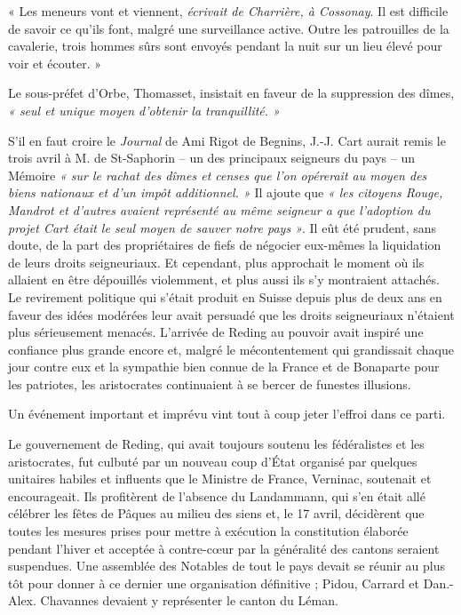 \documentclass[french,twoside]{book} %
\newenvironment{quoteblock}%
  {\begin{quoting}}
  {\end{quoting}}
\newenvironment{quotebar}{%
    \def\FrameCommand{{\color{rubric!10!}\vrule width 0.5em} \hspace{0.9em}}%
    \def\OuterFrameSep{\itemsep} %
    \MakeFramed {\advance\hsize-\width \FrameRestore}
  }%
  {%
    \endMakeFramed
  }
\renewenvironment{quoteblock}%
  {%
    \savenotes
    \setstretch{0.9}
    \begin{quotebar}
  }
  {%
    \end{quotebar}
    \spewnotes
  }
\begin{document}
\begin{quoteblock}
\noindent « Les meneurs vont et viennent, \emph{écrivait de Charrière, à Cossonay}. Il est difficile de savoir ce qu’ils font, malgré une surveillance active. Outre les patrouilles de la cavalerie, trois hommes sûrs sont envoyés pendant la nuit sur un lieu élevé pour voir et écouter. »\end{quoteblock}

\noindent Le sous-préfet d’Orbe, Thomasset, insistait en faveur de la suppression des dîmes, \emph{« seul et unique moyen d’obtenir la tranquillité. »}\par
S’il en faut croire le \emph{Journal} de Ami Rigot de Begnins, J.-J. Cart aurait remis le trois avril à M. de St-Saphorin – un des principaux seigneurs du pays – un Mémoire \emph{« sur le rachat des dîmes et censes que l’on opérerait au moyen des biens nationaux et d’un impôt additionnel. »} Il ajoute que \emph{« les citoyens Rouge, Mandrot et d’autres avaient représenté au même seigneur a que l’adoption du projet Cart était le seul moyen de sauver notre pays »}. Il eût été prudent, sans doute, de la part des propriétaires de fiefs de négocier eux-mêmes la liquidation de leurs droits seigneuriaux. Et cependant, plus approchait le moment où ils allaient en être dépouillés violemment, et plus aussi ils s’y montraient attachés. Le revirement politique qui s’était produit en Suisse depuis plus de deux ans en faveur des idées modérées leur avait persuadé que les droits seigneuriaux n’étaient plus sérieusement menacés. L’arrivée de Reding au pouvoir avait inspiré une confiance plus grande encore et, malgré le mécontentement qui grandissait chaque jour contre eux et la sympathie bien connue de la France et de Bonaparte pour les patriotes, les aristocrates continuaient à se bercer de funestes illusions.\par
Un événement important et imprévu vint tout à coup jeter l’effroi dans ce parti.\par
Le gouvernement de Reding, qui avait toujours soutenu les fédéralistes et les aristocrates, fut culbuté par un nouveau coup d’État organisé par quelques unitaires habiles et influents que le Ministre de France, Verninac, soutenait et encourageait. Ils profitèrent de l’absence du Landammann, qui s’en était allé célébrer les fêtes de Pâques au milieu des siens et, le 17 avril, décidèrent que toutes les mesures prises pour mettre à exécution la constitution élaborée pendant l’hiver et acceptée à contre-cœur par la généralité des cantons seraient suspendues. Une assemblée des Notables de tout le pays devait se réunir au plus tôt pour donner à ce dernier une organisation définitive ; Pidou, Carrard et Dan.-Alex. Chavannes devaient y représenter le canton du Léman.\par
\end{document}
